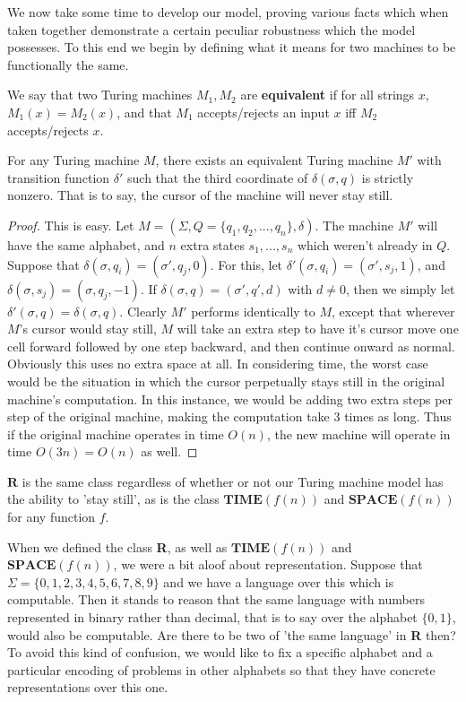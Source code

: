 We now take some time to develop our model, proving various facts which when taken together demonstrate a certain peculiar robustness which the model possesses. To this end we begin by defining what it means for two machines to be functionally the same.
\begin{definition}
	We say that two Turing machines $M_1,M_2$ are \textbf{equivalent} if for all strings $x$, $M_1(x) = M_2(x)$, and that $M_1$ accepts/rejects an input $x$ iff $M_2$ accepts/rejects $x$. 
\end{definition} 
\begin{lemma}
	For any Turing machine $M$, there exists an equivalent Turing machine $M'$ with transition function $\delta'$ such that the third coordinate of $\delta(\sigma,q)$ is strictly nonzero. That is to say, the cursor of the machine will never stay still.
\end{lemma}
\begin{proof}
	This is easy. Let $M = (\Sigma,Q = \{q_1,q_2,...,q_n\},\delta)$. The machine $M'$ will have the same alphabet, and $n$ extra states $s_1,...,s_n$ which weren't already in $Q$. Suppose that $\delta(\sigma,q_i) = (\sigma',q_j,0)$. For this, let $\delta'(\sigma,q_i) = (\sigma',s_j,1)$, and $\delta(\sigma,s_j) = (\sigma,q_j,-1)$. If $\delta(\sigma,q) = (\sigma',q',d)$ with $d \neq 0$, then we simply let $\delta'(\sigma,q) = \delta(\sigma,q)$. Clearly $M'$ performs identically to $M$, except that wherever $M$'s cursor would stay still, $M$ will take an extra step to have it's cursor move one cell forward followed by one step backward, and then continue onward as normal. Obviously this uses no extra space at all. In considering time, the worst case would be the situation in which the cursor perpetually stays still in the original machine's computation. In this instance, we would be adding two extra steps per step of the original machine, making the computation take $3$ times as long. Thus if the original machine operates in time $O(n)$, the new machine will operate in time $O(3n) = O(n)$ as well. 
\end{proof}
\begin{corollary}
	$\bm{R}$ is the same class regardless of whether or not our Turing machine model has the ability to 'stay still', as is the class $\bm{TIME}(f(n))$ and $\bm{SPACE}(f(n))$ for any function $f$. 
\end{corollary}
When we defined the class \textbf{R}, as well as $\bm{TIME}(f(n))$ and $\bm{SPACE}(f(n))$, we were a bit aloof about representation. Suppose that $\Sigma = \{0,1,2,3,4,5,6,7,8,9\}$ and we have a language over this which is computable. Then it stands to reason that the same language with numbers represented in binary rather than decimal, that is to say over the alphabet $\{0,1\}$, would also be computable. Are there to be two of 'the same language' in \textbf{R} then? To avoid this kind of confusion, we would like to fix a specific alphabet and a particular encoding of problems in other alphabets so that they have concrete representations over this one.

